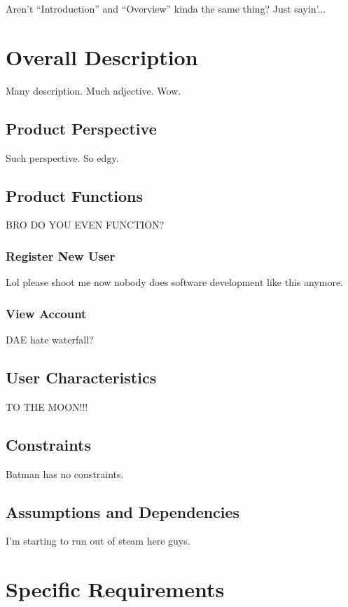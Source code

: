\documentclass{scrreprt}
\begin{document}
Aren't ``Introduction'' and ``Overview'' kinda the same thing? Just sayin'...

\chapter{Overall Description}

Many description. Much adjective. Wow.

\section{Product Perspective}

Such perspective. So edgy.

\section{Product Functions}

BRO DO YOU EVEN FUNCTION?

\subsection{Register New User}

Lol please shoot me now nobody does software development like this anymore.

\subsection{View Account}

DAE hate waterfall?

\section{User Characteristics}

TO THE MOON!!!

\section{Constraints}

Batman has no constraints.

\section{Assumptions and Dependencies}

I'm starting to run out of steam here guys.

\chapter{Specific Requirements}
\end{document}
